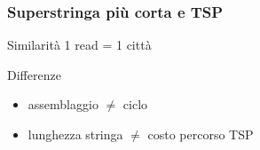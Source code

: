 \begin{frame}[fragile]
\frametitle{Superstringa più corta e TSP}
\begin{block}{Similarità}
1 read = 1 città
\end{block}
\begin{block}{Differenze}
\begin{itemize}
\item
assemblaggio $\neq$ ciclo
\item
lunghezza stringa $\neq$ costo percorso TSP
\end{itemize}
\end{block}

\end{frame}

